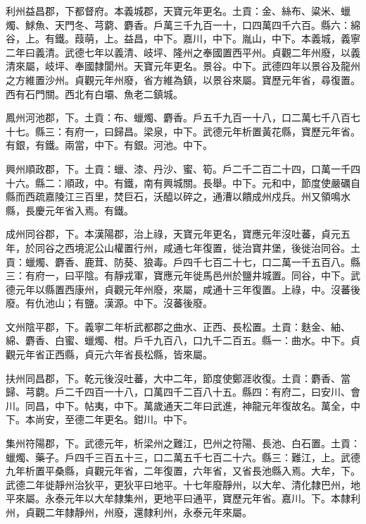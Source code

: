\begin{pinyinscope}
 利州益昌郡，下都督府。本義城郡，天寶元年更名。土貢：金、絲布、粱米、蠟燭、鯄魚、天門冬、芎藭、麝香。戶萬三千九百一十，口四萬四千六百。縣六：綿谷，上。有鐵。葭萌，上。益昌，中下。嘉川，中下。胤山，中下。本義城，義寧二年曰義清。武德七年以義清、岐坪、隆州之奉國置西平州。貞觀二年州廢，以義清來屬，岐坪、奉國隸閬州。天寶元年更名。景谷。中下。武德四年以景谷及龍州之方維置沙州。貞觀元年州廢，省方維為鎮，以景谷來屬。寶歷元年省，尋復置。西有石門關。西北有白壩、魚老二鎮城。



 鳳州河池郡，下。土貢：布、蠟燭、麝香。戶五千九百一十八，口二萬七千八百七十七。縣三：有府一，曰歸昌。梁泉，中下。武德元年析置黃花縣，寶歷元年省。有銀，有鐵。兩當，中下。有銀。河池。中下。



 興州順政郡，下。土貢：蠟、漆、丹沙、蜜、筍。戶二千二百二十四，口萬一千四十六。縣二：順政，中。有鐵，南有興城關。長舉。中下。元和中，節度使嚴礪自縣而西疏嘉陵江三百里，焚巨石，沃醯以碎之，通漕以饋成州戍兵。州又領鳴水縣，長慶元年省入焉。有鐵。



 成州同谷郡，下。本漢陽郡，治上祿，天寶元年更名，寶應元年沒吐蕃，貞元五年，於同谷之西境泥公山權置行州，咸通七年復置，徙治寶井堡，後徙治同谷。土貢：蠟燭、麝香、鹿茸、防葵、狼毒。戶四千七百二十七，口二萬一千五百八。縣三：有府一，曰平陰。有靜戎軍，寶應元年徙馬邑州於鹽井城置。同谷，中下。武德元年以縣置西康州，貞觀元年州廢，來屬，咸通十三年復置。上祿，中。沒蕃後廢。有仇池山；有鹽。漢源。中下。沒蕃後廢。



 文州陰平郡，下。義寧二年析武都郡之曲水、正西、長松置。土貢：麩金、紬、綿、麝香、白蜜、蠟燭、柑。戶千九百八，口九千二百五。縣一：曲水。中下。貞觀元年省正西縣，貞元六年省長松縣，皆來屬。



 扶州同昌郡，下。乾元後沒吐蕃，大中二年，節度使鄭涯收復。土貢：麝香、當歸、芎藭。戶二千四百一十八，口萬四千二百八十五。縣四：有府二，曰安川、會川。同昌，中下。帖夷，中下。萬歲通天二年曰武進，神龍元年復故名。萬全，中下。本尚安，至德二年更名。鉗川。中下。



 集州符陽郡，下。武德元年，析梁州之難江，巴州之符陽、長池、白石置。土貢：蠟燭、藥子。戶四千三百五十三，口二萬五千七百二十六。縣三：難江，上。武德九年析置平桑縣，貞觀元年省，二年復置，六年省，又省長池縣入焉。大牟，下。武德二年徙靜州治狄平，更狄平曰地平。十七年廢靜州，以大牟、清化隸巴州，地平來屬。永泰元年以大牟隸集州，更地平曰通平，寶歷元年省。嘉川。下。本隸利州，貞觀二年隸靜州，州廢，還隸利州，永泰元年來屬。




\end{pinyinscope}
